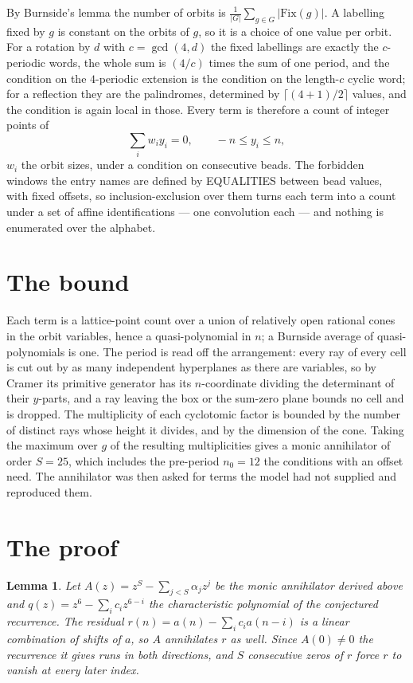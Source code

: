 \documentclass[11pt,a4paper]{article}
\theoremstyle{plain}
\newtheorem{lemma}[theorem]{Lemma}
\theoremstyle{definition}
\begin{document}
By Burnside's lemma the number of orbits is $\frac{1}{|G|}\sum_{g\in G}|\mathrm{Fix}(g)|$.
A labelling fixed by $g$ is constant on the orbits of $g$, so it is a choice of one value per
orbit. For a rotation by $d$ with $c=\gcd(4,d)$ the fixed labellings are exactly the
$c$-periodic words, the whole sum is $(4/c)$ times the sum of one period, and the condition on
the $4$-periodic extension is the condition on the length-$c$ cyclic word; for a reflection
they are the palindromes, determined by $\lceil(4+1)/2\rceil$ values, and the condition is
again local in those. Every term is therefore a count of integer points of
\[
\sum_i w_i y_i = 0, \qquad -n \le y_i \le n,
\]
$w_i$ the orbit sizes, under a condition on consecutive beads. The forbidden windows the entry
names are defined by EQUALITIES between bead values, with fixed offsets, so inclusion-exclusion
over them turns each term into a count under a set of affine identifications --- one
convolution each --- and nothing is enumerated over the alphabet.

\section{The bound}

Each term is a lattice-point count over a union of relatively open rational cones in the orbit
variables, hence a quasi-polynomial in $n$; a Burnside average of quasi-polynomials is one. The
period is read off the arrangement: every ray of every cell is cut out by as many independent
hyperplanes as there are variables, so by Cramer its primitive generator has its $n$-coordinate
dividing the determinant of their $y$-parts, and a ray leaving the box or the sum-zero plane
bounds no cell and is dropped. The multiplicity of each cyclotomic factor is bounded by the
number of distinct rays whose height it divides, and by the dimension of the cone. Taking the
maximum over $g$ of the resulting multiplicities gives a monic annihilator of order
$S=25$, which includes the pre-period $n_0=12$ the conditions with an offset need. The
annihilator was then asked for terms the model had not supplied and reproduced them.

\section{The proof}

\begin{lemma}\label{lem:crit}
Let $A(z)=z^S-\sum_{j<S}\alpha_jz^{j}$ be the monic annihilator derived above and
$q(z)=z^{6}-\sum_ic_iz^{6-i}$ the characteristic polynomial of the conjectured
recurrence. The residual $r(n)=a(n)-\sum_ic_ia(n-i)$ is a linear combination of shifts of $a$,
so $A$ annihilates $r$ as well. Since $A(0)\ne0$ the recurrence it gives runs in both
directions, and $S$ consecutive zeros of $r$ force $r$ to vanish at every later index.
\end{lemma}
\end{document}
